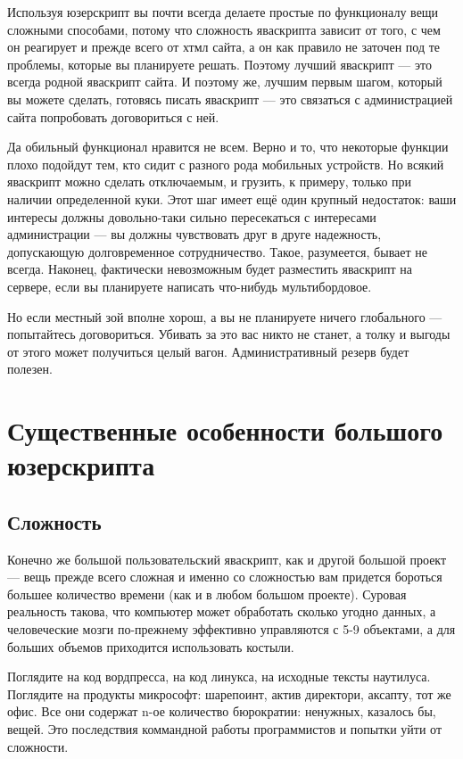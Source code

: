 \documentclass[12pt,a4paper]{article}
\begin{document}
Используя юзерскрипт вы почти всегда делаете простые по функционалу вещи сложными способами, потому что сложность яваскрипта зависит от того, с чем он реагирует и прежде всего от хтмл сайта, а он как правило не заточен под те проблемы, которые вы планируете решать. Поэтому лучший яваскрипт --- это всегда родной яваскрипт сайта. И поэтому же, лучшим первым шагом, который вы можете сделать, готовясь писать яваскрипт --- это связаться с администрацией сайта попробовать договориться с ней. 

Да обильный функционал нравится не всем. Верно и то, что некоторые функции плохо подойдут тем, кто сидит с разного рода мобильных устройств. Но всякий яваскрипт можно сделать отключаемым, и грузить, к примеру, только при наличии определенной куки. Этот шаг имеет ещё один крупный недостаток: ваши интересы должны довольно-таки сильно пересекаться с интересами администрации --- вы должны чувствовать друг в друге надежность, допускающую долговременное сотрудничество. Такое, разумеется, бывает не всегда. Наконец, фактически невозможным будет разместить яваскрипт на сервере, если вы планируете написать что-нибудь мультибордовое.

Но если местный зой вполне хорош, а вы не планируете ничего глобального --- попытайтесь договориться. Убивать за это вас никто не станет, а толку и выгоды от этого может получиться целый вагон. Административный резерв будет полезен.

\section{Существенные особенности большого юзерскрипта}

\subsection{Сложность}

Конечно же большой пользовательский яваскрипт, как и другой большой проект --- вещь прежде всего сложная и именно со сложностью вам придется бороться большее количество времени (как и в любом большом проекте). Суровая реальность такова, что компьютер может обработать сколько угодно данных, а человеческие мозги по-прежнему эффективно управляются с 5-9 объектами, а для больших объемов приходится использовать костыли.

Поглядите на код вордпресса, на код линукса, на исходные тексты наутилуса. Поглядите на продукты микрософт: шарепоинт, актив директори, аксапту, тот же офис. Все они содержат n-ое количество бюрократии: ненужных, казалось бы, вещей. Это последствия коммандной работы программистов и попытки уйти от сложности.
\end{document}
